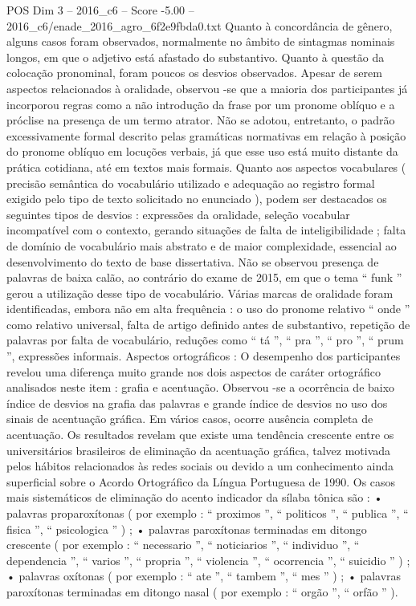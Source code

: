 \begin{textsample}{POS Dim 3 – 2016\_c6 – Score -5.00 – 2016\_c6/enade\_2016\_agro\_6f2e9fbda0.txt}
Quanto à concordância de gênero, alguns casos foram observados, normalmente no âmbito de sintagmas nominais longos, em que o adjetivo está afastado do substantivo.
Quanto à questão da colocação pronominal, foram poucos os desvios observados.
Apesar de serem aspectos relacionados à oralidade, observou -se que a maioria dos participantes já incorporou regras como a não introdução da frase por um pronome oblíquo e a próclise na presença de um termo atrator.
Não se adotou, entretanto, o padrão excessivamente formal descrito pelas gramáticas normativas em relação à posição do pronome oblíquo em locuções verbais, já que esse uso está muito distante da prática cotidiana, até em textos mais formais.
Quanto aos aspectos vocabulares ( precisão semântica do vocabulário utilizado e adequação ao registro formal exigido pelo tipo de texto solicitado no enunciado ), podem ser destacados os seguintes tipos de desvios : expressões da oralidade, seleção vocabular incompatível com o contexto, gerando situações de falta de inteligibilidade ; falta de domínio de vocabulário mais abstrato e de maior complexidade, essencial ao desenvolvimento do texto de base dissertativa.
Não se observou presença de palavras de baixa calão, ao contrário do exame de 2015, em que o tema “ funk ” gerou a utilização desse tipo de vocabulário.
Várias marcas de oralidade foram identificadas, embora não em alta frequência : o uso do pronome relativo “ onde ” como relativo universal, falta de artigo definido antes de substantivo, repetição de palavras por falta de vocabulário, reduções como “ tá ”, “ pra ”, “ pro ”, “ prum ”, expressões informais.
Aspectos ortográficos : O desempenho dos participantes revelou uma diferença muito grande nos dois aspectos de caráter ortográfico analisados neste item : grafia e acentuação.
Observou -se a ocorrência de baixo índice de desvios na grafia das palavras e grande índice de desvios no uso dos sinais de acentuação gráfica.
Em vários casos, ocorre ausência completa de acentuação.
Os resultados revelam que existe uma tendência crescente entre os universitários brasileiros de eliminação da acentuação gráfica, talvez motivada pelos hábitos relacionados às redes sociais ou devido a um conhecimento ainda superficial sobre o Acordo Ortográfico da Língua Portuguesa de 1990.
Os casos mais sistemáticos de eliminação do acento indicador da sílaba tônica são : • palavras proparoxítonas ( por exemplo : “ proximos ”, “ politicos ”, “ publica ”, “ fisica ”, “ psicologica ” ) ; • palavras paroxítonas terminadas em ditongo crescente ( por exemplo : “ necessario ”, “ noticiarios ”, “ individuo ”, “ dependencia ”, “ varios ”, “ propria ”, “ violencia ”, “ ocorrencia ”, “ suicidio ” ) ; • palavras oxítonas ( por exemplo : “ ate ”, “ tambem ”, “ mes ” ) ; • palavras paroxítonas terminadas em ditongo nasal ( por exemplo : “ orgão ”, “ orfão ” ).

\end{textsample}
